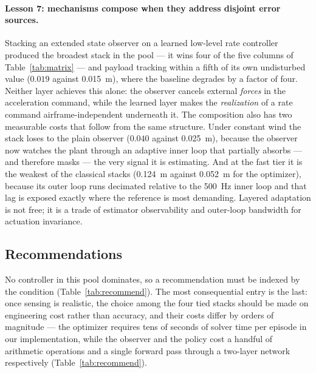 \paragraph{Lesson 7: mechanisms compose when they address disjoint error sources.}
Stacking an extended state observer on a learned low-level rate controller produced the
broadest stack in the pool --- it wins four of the five columns of
Table~\ref{tab:matrix} --- and payload tracking within a fifth of its own undisturbed
value ($0.019$ against \SI{0.015}{\meter}), where the baseline degrades by a factor of
four. Neither layer achieves this alone: the observer cancels external \emph{forces} in
the acceleration command, while the learned layer makes the \emph{realization} of a rate
command airframe-independent underneath it. The composition also has two measurable costs
that follow from the same structure. Under constant wind the stack loses to the plain
observer ($0.040$ against \SI{0.025}{\meter}), because the observer now watches the plant
through an adaptive inner loop that partially absorbs --- and therefore masks --- the very
signal it is estimating. And at the fast tier it is the weakest of the classical stacks
(\SI{0.124}{\meter} against \SI{0.052}{\meter} for the optimizer), because its outer loop
runs decimated relative to the \SI{500}{\hertz} inner loop and that lag is exposed exactly
where the reference is most demanding. Layered adaptation is not free; it is a trade of
estimator observability and outer-loop bandwidth for actuation invariance.

\subsection{Recommendations}
\label{sec:results:recommendations}

No controller in this pool dominates, so a recommendation must be indexed by the
condition (Table~\ref{tab:recommend}). The most consequential entry is the last: once
sensing is realistic, the choice among the four tied stacks should be made on
engineering cost rather than accuracy, and their costs differ by orders of magnitude ---
the optimizer requires tens of seconds of solver time per episode in our implementation,
while the observer and the policy cost a handful of arithmetic operations and a single
forward pass through a two-layer network respectively (Table~\ref{tab:recommend}).

